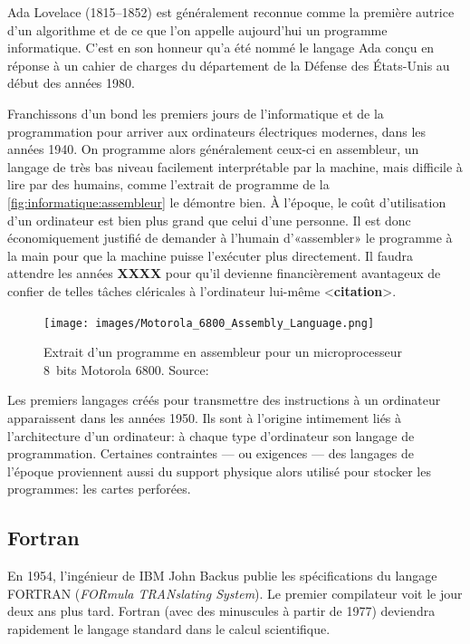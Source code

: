 Ada Lovelace (1815--1852) est généralement reconnue comme la première
autrice d'un algorithme et de ce que l'on appelle aujourd'hui un
programme informatique. C'est en son honneur qu'a été nommé le langage
Ada conçu en réponse à un cahier de charges du département de la
Défense des États-Unis au début des années 1980.

Franchissons d'un bond les premiers jours de l'informatique et de la
programmation pour arriver aux ordinateurs électriques modernes, dans
les années 1940. On programme alors généralement ceux-ci en
assembleur, un langage de très bas niveau facilement
interprétable par la machine, mais difficile à lire par des humains,
comme l'extrait de programme de la
\autoref{fig:informatique:assembleur} le démontre bien. À l'époque, le
coût d'utilisation d'un ordinateur est bien plus grand que celui d'une
personne. Il est donc économiquement justifié de demander à l'humain
d'«assembler» le programme à la main pour que la machine puisse
l'exécuter plus directement. Il faudra attendre les années
\textbf{XXXX} pour qu'il devienne financièrement avantageux de confier
de telles tâches cléricales à l'ordinateur lui-même <\textbf{citation}>.

\begin{figure}
  \centering
  \texttt{[image: images/Motorola\_6800\_Assembly\_Language.png]}
  \caption[Programme en assembleur pour un microprocesseur 8~bits
  Motorola 6800.]{Extrait d'un programme en assembleur pour un
    microprocesseur 8~bits Motorola 6800. {\small Source:
      }}
  \label{fig:informatique:assembleur}
\end{figure}

Les premiers langages créés pour transmettre des instructions à un
ordinateur apparaissent dans les années 1950. Ils sont à l'origine
intimement liés à l'architecture d'un ordinateur: à chaque type
d'ordinateur son langage de programmation. Certaines contraintes ---
ou exigences --- des langages de l'époque proviennent aussi du support
physique alors utilisé pour stocker les programmes: les cartes
perforées.

\subsection{Fortran}
\label{sec:informatique:historique:fortran}

En 1954, l'ingénieur de IBM John Backus publie les spécifications du
langage FORTRAN (\emph{FORmula TRANslating System}). Le
premier compilateur voit le jour deux ans plus tard. Fortran (avec des
minuscules à partir de 1977) deviendra rapidement le langage standard
dans le calcul scientifique.

